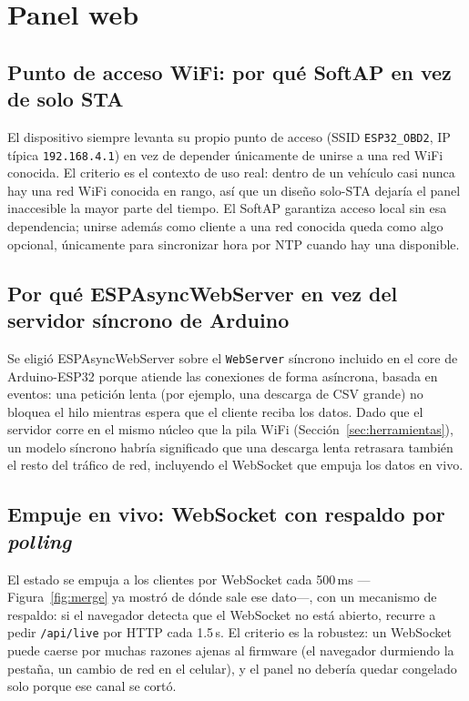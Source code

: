 \section{Panel web}
\label{sec:panelweb}

\subsection{Punto de acceso WiFi: por qué SoftAP en vez de solo STA}
El dispositivo siempre levanta su propio punto de acceso (SSID
\texttt{ESP32\_OBD2}, IP típica \texttt{192.168.4.1}) en vez de depender
únicamente de unirse a una red WiFi conocida. El criterio es el contexto de
uso real: dentro de un vehículo casi nunca hay una red WiFi conocida en
rango, así que un diseño solo-STA dejaría el panel inaccesible la mayor
parte del tiempo. El SoftAP garantiza acceso local sin esa dependencia;
unirse además como cliente a una red conocida queda como algo opcional,
únicamente para sincronizar hora por NTP cuando hay una disponible.

\subsection{Por qué ESPAsyncWebServer en vez del servidor síncrono de Arduino}
Se eligió ESPAsyncWebServer \cite{espasyncwebserver2024} sobre el
\texttt{WebServer} síncrono incluido en el core de Arduino-ESP32 porque
atiende las conexiones de forma asíncrona, basada en eventos: una petición
lenta (por ejemplo, una descarga de CSV grande) no bloquea el hilo mientras
espera que el cliente reciba los datos. Dado que el servidor corre en el
mismo núcleo que la pila WiFi (Sección~\ref{sec:herramientas}), un modelo
síncrono habría significado que una descarga lenta retrasara también el
resto del tráfico de red, incluyendo el WebSocket que empuja los datos en
vivo.

\subsection{Empuje en vivo: WebSocket con respaldo por \textit{polling}}
El estado se empuja a los clientes por WebSocket cada 500\,ms
—Figura~\ref{fig:merge} ya mostró de dónde sale ese dato—, con un
mecanismo de respaldo: si el navegador detecta que el WebSocket no está
abierto, recurre a pedir \texttt{/api/live} por HTTP cada 1.5\,s. El
criterio es la robustez: un WebSocket puede caerse por muchas razones ajenas
al firmware (el navegador durmiendo la pestaña, un cambio de red en el
celular), y el panel no debería quedar congelado solo porque ese canal se
cortó.

